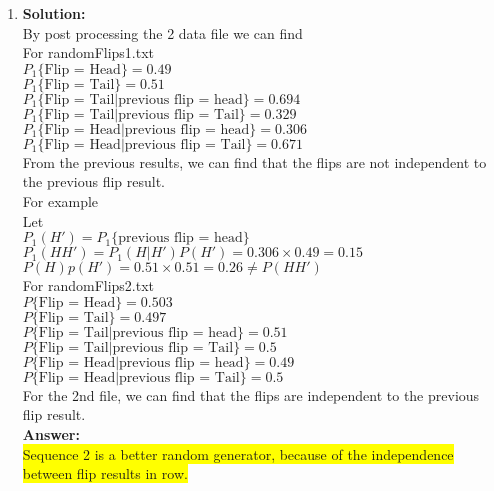 \documentclass{article}
\newcommand{\myansw}{\textbf{Answer:}\\}
\newcommand{\mysolu}{\textbf{Solution:}\\}
\begin{document}
\begin{enumerate}
\begin{enumerate}
	\end{enumerate}
	\item
	\mysolu
	By post processing the 2 data file we can find\\
	For randomFlips1.txt\\
	${P_1\{\text{Flip = Head}\} = 0.49 }$\\
	${P_1\{\text{Flip = Tail}\} = 0.51 }$\\
	${P_1\{\text{Flip = Tail|previous flip = head}\} = 0.694 }$\\
	${P_1\{\text{Flip = Tail|previous flip = Tail}\} = 0.329 }$\\
	${P_1\{\text{Flip = Head|previous flip = head}\} = 0.306 }$\\
	${P_1\{\text{Flip = Head|previous flip = Tail}\} = 0.671 }$\\

	From the previous results, we can find that the flips are not independent to the previous flip result.\\
	For example\\
	Let\\
	$P_1(H') = P_1\{\text{previous flip = head}\}$\\
	$P_1(HH') = P_1(H|H')P(H') = 0.306 \times 0.49 = 0.15$\\
	$P(H)p(H') = 0.51 \times 0.51 = 0.26  \neq P(HH')$\\
	For randomFlips2.txt\\
	${P\{\text{Flip = Head}\} = 0.503 }$\\
	${P\{\text{Flip = Tail}\} = 0.497 }$\\
	${P\{\text{Flip = Tail|previous flip = head}\} = 0.51 }$\\
	${P\{\text{Flip = Tail|previous flip = Tail}\} = 0.5 }$\\
	${P\{\text{Flip = Head|previous flip = head}\} = 0.49 }$\\
	${P\{\text{Flip = Head|previous flip = Tail}\} = 0.5 }$\\
	For the 2nd file, we can find that the flips are independent to the previous flip result.\\
	\myansw
	\colorbox{yellow}{Sequence 2 is a better random generator, because of the independence between flip results in row.}\\
	

\end{enumerate}
\end{document}
